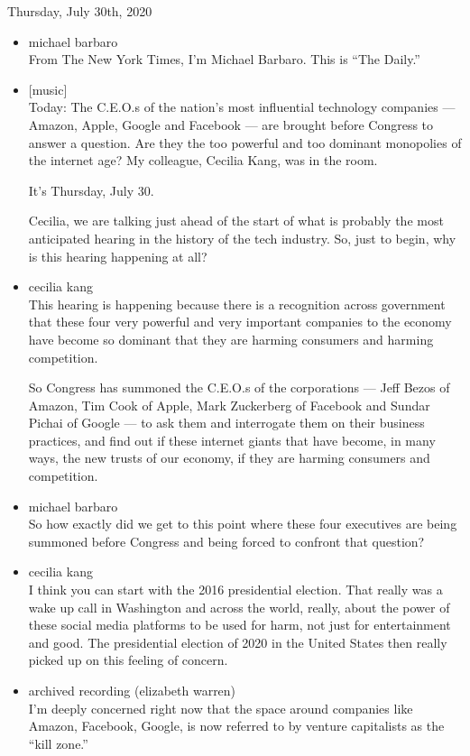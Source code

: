 Thursday, July 30th, 2020

\begin{itemize}
\item
  michael barbaro\\
  From The New York Times, I'm Michael Barbaro. This is ``The Daily.''
\item
  {[}music{]}\\
  Today: The C.E.O.s of the nation's most influential technology
  companies --- Amazon, Apple, Google and Facebook --- are brought
  before Congress to answer a question. Are they the too powerful and
  too dominant monopolies of the internet age? My colleague, Cecilia
  Kang, was in the room.

  It's Thursday, July 30.

  Cecilia, we are talking just ahead of the start of what is probably
  the most anticipated hearing in the history of the tech industry. So,
  just to begin, why is this hearing happening at all?
\item
  cecilia kang\\
  This hearing is happening because there is a recognition across
  government that these four very powerful and very important companies
  to the economy have become so dominant that they are harming consumers
  and harming competition.

  So Congress has summoned the C.E.O.s of the corporations --- Jeff
  Bezos of Amazon, Tim Cook of Apple, Mark Zuckerberg of Facebook and
  Sundar Pichai of Google --- to ask them and interrogate them on their
  business practices, and find out if these internet giants that have
  become, in many ways, the new trusts of our economy, if they are
  harming consumers and competition.
\item
  michael barbaro\\
  So how exactly did we get to this point where these four executives
  are being summoned before Congress and being forced to confront that
  question?
\item
  cecilia kang\\
  I think you can start with the 2016 presidential election. That really
  was a wake up call in Washington and across the world, really, about
  the power of these social media platforms to be used for harm, not
  just for entertainment and good. The presidential election of 2020 in
  the United States then really picked up on this feeling of concern.
\item
  archived recording (elizabeth warren)\\
  I'm deeply concerned right now that the space around companies like
  Amazon, Facebook, Google, is now referred to by venture capitalists as
  the ``kill zone.''
\end{itemize}

